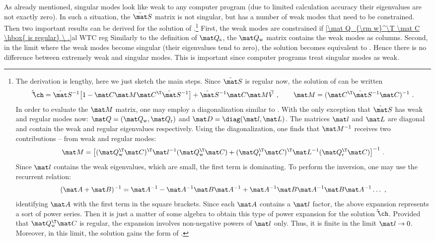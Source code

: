 As already mentioned, singular modes look like weak to any computer program (due to limited calculation accuracy their eigenvalues are not exactly zero). In such a situation, the $\tilde\mat S$ matrix is not singular, but has a number of weak modes that need to be constrained. Then two important results can be derived for the solution of .\footnote{%
The derivation is lengthy, here we just sketch the main steps. Since $\tilde\mat S$ is regular now, the solution of  can be written
$$
	\hat\vec\ch = \tilde\mat S^{-1} \big[ 1 - \mat C \mat M \mat C^\T \tilde\mat S^{-1} \big]
		+ \tilde\mat S^{-1} \mat C \mat M \vec V\ ,\qquad
	\mat M = (\mat C^\T \tilde\mat S^{-1} \mat C)^{-1}\ .
$$
In order to evaluate the $\mat M$ matrix, one may employ a diagonalization similar to . With the only exception that $\tilde\mat S$ has weak and regular modes now: $\mat Q = (\mat Q_{\rm w}, \mat Q_{\rm r})$ and $\mat D = \diag(\mat l, \mat L)$. The matrices $\mat l$ and $\mat L$ are diagonal and contain the weak and regular eigenvalues respectively. Using the diagonalization, one finds that $\mat M^{-1}$ receives two contributions -- from weak and regular modes:
$$ \mat M = \big[
	(\mat Q_{\rm w}^\T \mat C)^\T \mat l^{-1} (\mat Q_{\rm w}^\T \mat C)
	+ (\mat Q_{\rm r}^\T \mat C)^\T \mat L^{-1} (\mat Q_{\rm r}^\T \mat C)
\big]^{-1}\ .$$
Since $\mat l$ contains the weak eigenvalues, which are small, the first term is dominating. To perform the inversion, one may use the recurrent relation:
$$(\mat A+\mat B)^{-1} = \mat A^{-1} - \mat A^{-1} \mat B \mat A^{-1} + \mat A^{-1} \mat B \mat A^{-1} \mat B \mat A^{-1} \ldots\ ,$$
identifying $\mat A$ with the first term in the square brackets. Since each $\mat A$ contains a $\mat l$ factor, the above expansion represents a sort of power series. Then it is just a matter of some algebra to obtain this type of power expansion for the solution $\hat\vec\ch$. Provided that $\mat Q_{\rm w}^\T \mat C$ is regular, the expansion involves non-negative powers of $\mat l$ only. Thus, it is finite in the limit $\mat l\to 0$. Moreover, in this limit, the solution gains the form of .
}
First, the weak modes are constrained if
\eqref{\mat Q_{\rm w}^\T \mat C \hbox{ is regular} \ .}{al WTC reg}
Similarly to the definition of $\mat Q_{\rm s}$, the $\mat Q_{\rm w}$ matrix contains the weak modes as columns.
Second, in the limit where the weak modes become singular (their eigenvalues tend to zero), the solution becomes equivalent to . Hence there is no difference between extremely weak and singular modes. This is important since computer programs treat singular modes as weak.

